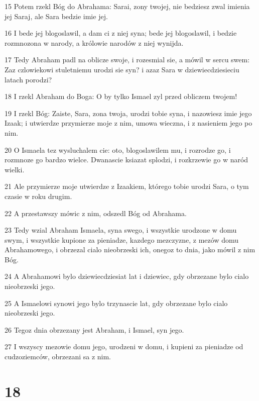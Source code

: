 \par 15 Potem rzekl Bóg do Abrahama: Sarai, zony twojej, nie bedziesz zwal imienia jej Saraj, ale Sara bedzie imie jej.
\par 16 I bede jej blogoslawil, a dam ci z niej syna; bede jej blogoslawil, i bedzie rozmnozona w narody, a królowie narodów z niej wynijda.
\par 17 Tedy Abraham padl na oblicze swoje, i rozesmial sie, a mówil w sercu swem: Zaz czlowiekowi stuletniemu urodzi sie syn? i azaz Sara w dziewiecdziesieciu latach porodzi?
\par 18 I rzekl Abraham do Boga: O by tylko Ismael zyl przed obliczem twojem!
\par 19 I rzekl Bóg: Zaiste, Sara, zona twoja, urodzi tobie syna, i nazowiesz imie jego Izaak; i utwierdze przymierze moje z nim, umowa wieczna, i z nasieniem jego po nim.
\par 20 O Ismaela tez wysluchalem cie: oto, blogoslawilem mu, i rozrodze go, i rozmnoze go bardzo wielce. Dwanascie ksiazat splodzi, i rozkrzewie go w naród wielki.
\par 21 Ale przymierze moje utwierdze z Izaakiem, którego tobie urodzi Sara, o tym czasie w roku drugim.
\par 22 A przestawszy mówic z nim, odszedl Bóg od Abrahama.
\par 23 Tedy wzial Abraham Ismaela, syna swego, i wszystkie urodzone w domu swym, i wszystkie kupione za pieniadze, kazdego mezczyzne, z mezów domu Abrahamowego, i obrzezal cialo nieobrzeski ich, onegoz to dnia, jako mówil z nim Bóg.
\par 24 A Abrahamowi bylo dziewiecdziesiat lat i dziewiec, gdy obrzezane bylo cialo nieobrzeski jego.
\par 25 A Ismaelowi synowi jego bylo trzynascie lat, gdy obrzezane bylo cialo nieobrzeski jego.
\par 26 Tegoz dnia obrzezany jest Abraham, i Ismael, syn jego.
\par 27 I wszyscy mezowie domu jego, urodzeni w domu, i kupieni za pieniadze od cudzoziemców, obrzezani sa z nim.

\chapter{18}

